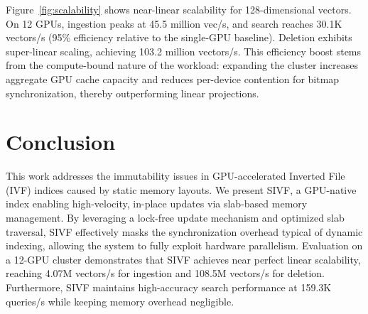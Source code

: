 \documentclass[sigconf,nonacm]{acmart}
\theoremstyle{plain}
\theoremstyle{definition}
\theoremstyle{remark}
\begin{document}
Figure~\ref{fig:scalability} shows near-linear scalability for 128-dimensional vectors. On 12 GPUs, ingestion peaks at 45.5 million vec/s, and search reaches 30.1K vectors/s (95\% efficiency relative to the single-GPU baseline). Deletion exhibits super-linear scaling, achieving 103.2 million vectors/s. This efficiency boost stems from the compute-bound nature of the workload: expanding the cluster increases aggregate GPU cache capacity and reduces per-device contention for bitmap synchronization, thereby outperforming linear projections.

\section{Conclusion}
\label{sec:conclusion}

This work addresses the immutability issues in GPU-accelerated Inverted File (IVF) indices caused by static memory layouts. We present SIVF, a GPU-native index enabling high-velocity, in-place updates via slab-based memory management. By leveraging a lock-free update mechanism and optimized slab traversal, SIVF effectively masks the synchronization overhead typical of dynamic indexing, allowing the system to fully exploit hardware parallelism. Evaluation on a 12-GPU cluster demonstrates that SIVF achieves near perfect linear scalability, reaching 4.07M vectors/s for ingestion and 108.5M vectors/s for deletion. Furthermore, SIVF maintains high-accuracy search performance at 159.3K queries/s while keeping memory overhead negligible.






\end{document}
